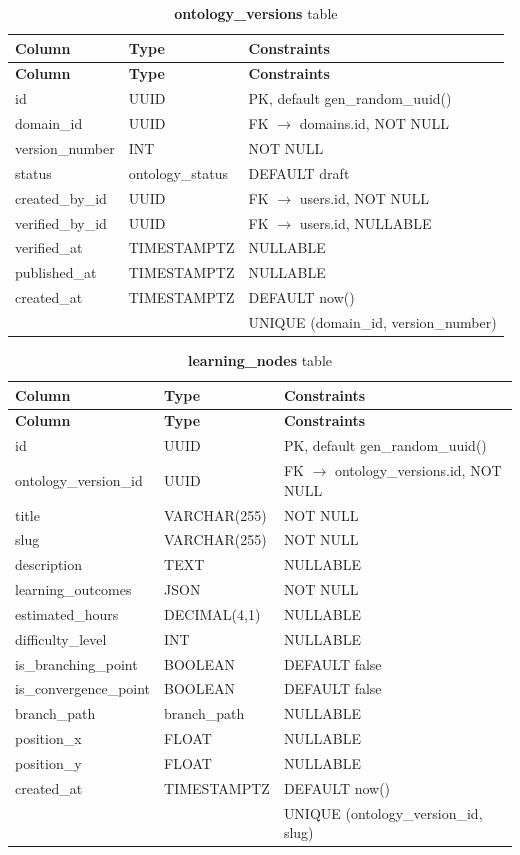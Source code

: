 \begin{longtable}{p{3cm}p{2.5cm}p{5cm}}
\caption{\textbf{ontology\_versions} table}
\label{tab:ch04_ontology_versions}\\
\toprule
\textbf{Column} & \textbf{Type} & \textbf{Constraints} \\
\midrule
\endfirsthead
\toprule
\textbf{Column} & \textbf{Type} & \textbf{Constraints} \\
\midrule
\endhead
id & UUID & PK, default gen\_random\_uuid() \\
domain\_id & UUID & FK $\rightarrow$ domains.id, NOT NULL \\
version\_number & INT & NOT NULL \\
status & ontology\_status & DEFAULT draft \\
created\_by\_id & UUID & FK $\rightarrow$ users.id, NOT NULL \\
verified\_by\_id & UUID & FK $\rightarrow$ users.id, NULLABLE \\
verified\_at & TIMESTAMPTZ & NULLABLE \\
published\_at & TIMESTAMPTZ & NULLABLE \\
created\_at & TIMESTAMPTZ & DEFAULT now() \\
 &  & UNIQUE (domain\_id, version\_number) \\
\bottomrule
\end{longtable}

\begin{longtable}{p{3cm}p{2.5cm}p{5cm}}
\caption{\textbf{learning\_nodes} table}
\label{tab:ch04_learning_nodes}\\
\toprule
\textbf{Column} & \textbf{Type} & \textbf{Constraints} \\
\midrule
\endfirsthead
\toprule
\textbf{Column} & \textbf{Type} & \textbf{Constraints} \\
\midrule
\endhead
id & UUID & PK, default gen\_random\_uuid() \\
ontology\_version\_id & UUID & FK $\rightarrow$ ontology\_versions.id, NOT NULL \\
title & VARCHAR(255) & NOT NULL \\
slug & VARCHAR(255) & NOT NULL \\
description & TEXT & NULLABLE \\
learning\_outcomes & JSON & NOT NULL \\
estimated\_hours & DECIMAL(4,1) & NULLABLE \\
difficulty\_level & INT & NULLABLE \\
is\_branching\_point & BOOLEAN & DEFAULT false \\
is\_convergence\_point & BOOLEAN & DEFAULT false \\
branch\_path & branch\_path & NULLABLE \\
position\_x & FLOAT & NULLABLE \\
position\_y & FLOAT & NULLABLE \\
created\_at & TIMESTAMPTZ & DEFAULT now() \\
 &  & UNIQUE (ontology\_version\_id, slug) \\
\bottomrule
\end{longtable}

